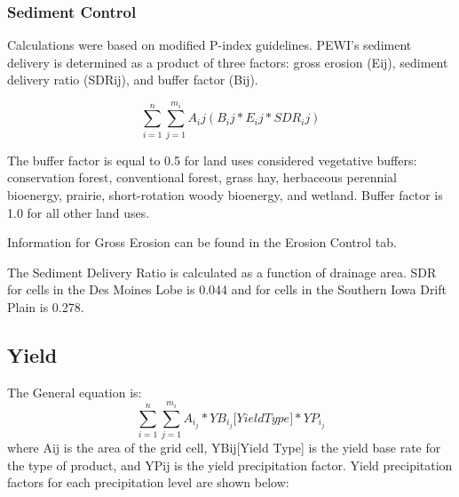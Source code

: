 \documentclass[11pt]{article}
\begin{document}
\subsubsection{Sediment Control}
Calculations were based on modified P-index guidelines.\cite{63}  PEWI’s sediment delivery is determined as a product of three factors: gross erosion (Eij), sediment delivery ratio (SDRij), and buffer factor (Bij).

$$\sum_{i=1}^n \sum_{j=1}^{m_i}A_ij (B_ij*E_ij*SDR_ij ) $$

The buffer factor is equal to 0.5 for land uses considered vegetative buffers: conservation forest, conventional forest, grass hay, herbaceous perennial bioenergy, prairie, short-rotation woody bioenergy, and wetland. Buffer factor is 1.0 for all other land uses.\cite{64} 

Information for Gross Erosion can be found in the Erosion Control tab.

The Sediment Delivery Ratio is calculated as a function of drainage area. SDR for cells in the Des Moines Lobe is 0.044 and for cells in the Southern Iowa Drift Plain is 0.278.\cite{65}


\subsection{Yield}
The General equation is:
$$\sum_{i=1}^n \sum_{j=1}^{m_i}A_i_j *YB_i_j\bigg[Yield Type\bigg]*YP_i_j $$
where Aij  is the area of the grid cell, YBij[Yield Type] is the yield base rate for the type of product, and YPij is the yield precipitation factor. Yield precipitation factors for each precipitation level are shown below:
\end{document}
